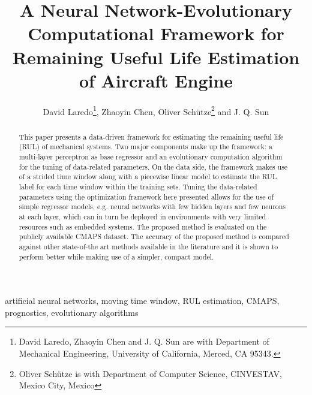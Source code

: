 
\title{A Neural Network-Evolutionary Computational Framework for Remaining Useful Life Estimation of Aircraft Engine}

\author{David Laredo\thanks{David Laredo, Zhaoyin Chen and J. Q. Sun are with Department of Mechanical Engineering, University of California, Merced, CA 95343.}, Zhaoyin Chen, Oliver Sch\"utze\thanks{Oliver Sch\"utze is with Department of Computer Science, CINVESTAV, Mexico City, Mexico} and J. Q. Sun}%


\maketitle

\begin{abstract}
This paper presents a data-driven framework for estimating the remaining useful life (RUL) of mechanical systems. Two major components make up the framework: a multi-layer perceptron as base regressor and an evolutionary computation algorithm for the tuning of data-related parameters. On the data side, the framework makes use of a strided time window along with a piecewise linear model to estimate the RUL label for each time window within the training sets. Tuning the data-related parameters using the optimization framework here presented allows for the use of simple regressor models, e.g. neural networks with few hidden layers and few neurons at each layer, which can in turn be deployed in environments with very limited resources such as embedded systems. The proposed method is evaluated on the publicly available CMAPS dataset. The accuracy of the proposed method is compared against other state-of-the art methods available in the literature and it is shown to perform better while making use of a simpler, compact model.
\end{abstract}


\begin{keywords}
artificial neural networks, moving time window, RUL estimation, CMAPS, prognostics, evolutionary algorithms
\end{keywords}

